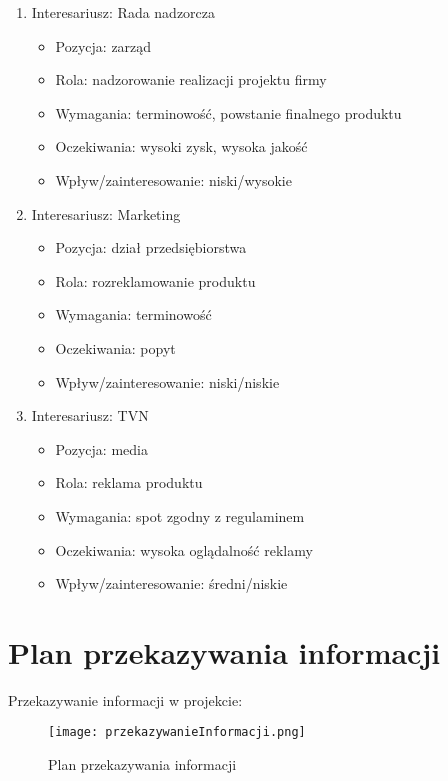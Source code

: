 \begin{enumerate}
	\item Interesariusz: Rada nadzorcza
\begin{itemize}

	\item Pozycja: zarząd
	\item Rola: nadzorowanie realizacji projektu firmy
	\item Wymagania: terminowość, powstanie finalnego produktu
	\item Oczekiwania: wysoki zysk, wysoka jakość
	\item Wpływ/zainteresowanie: niski/wysokie
	\end{itemize}

	\item Interesariusz: Marketing
\begin{itemize}

	\item Pozycja: dział przedsiębiorstwa
	\item Rola: rozreklamowanie produktu
	\item Wymagania: terminowość
	\item Oczekiwania: popyt
	\item Wpływ/zainteresowanie: niski/niskie
	\end{itemize}

	\item Interesariusz: TVN
\begin{itemize}

	\item Pozycja: media
	\item Rola: reklama produktu
	\item Wymagania: spot zgodny z regulaminem
	\item Oczekiwania: wysoka oglądalność reklamy
	\item Wpływ/zainteresowanie: średni/niskie
	\end{itemize}

\end{enumerate}

\clearpage


\section{Plan przekazywania informacji}

Przekazywanie informacji w projekcie: 

\begin{figure}[!h]
\centering
\texttt{[image: przekazywanieInformacji.png]}
\caption{Plan przekazywania informacji}
\label{fig:przekazywanieInformacji}
\end{figure}

